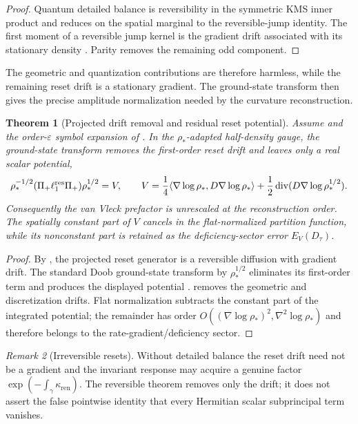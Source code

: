\documentclass[11pt]{article}
\newtheorem{theorem}{Theorem}[section]
\theoremstyle{definition}
\theoremstyle{remark}
\newtheorem{remark}[theorem]{Remark}
\newcommand{\eps}{\varepsilon}
\newcommand{\ren}{\mathrm{ren}}
\newcommand{\rstar}{\rho_*}
\DeclareMathOperator{\dive}{div}
\begin{document}
\begin{proof}
Quantum detailed balance is reversibility in the symmetric KMS inner product and
reduces on the spatial marginal to the reversible-jump identity.  The first
moment of a reversible jump kernel is the gradient drift associated with its
stationary density \cite{KossakowskiFGV,Alicki1976,Cipriani,KipnisLandim}.
Parity removes the remaining odd component.
\end{proof}

The geometric and quantization contributions are therefore harmless, while
the remaining reset drift is a stationary gradient. The ground-state transform
then gives the precise amplitude normalization needed by the curvature
reconstruction.

\begin{theorem}[Projected drift removal and residual reset potential]
\label{thm:drift-cancellation}
Assume  and the order-$\eps$ symbol expansion of
.  In the $\rstar$-adapted half-density gauge,
the ground-state transform removes the first-order reset drift and leaves only a
real scalar potential,
\[
 \rstar^{-1/2}(\Pi_+\ell_1^{\rm res}\Pi_+)\rstar^{1/2}=V,
 \qquad
 V=\frac14\langle\nabla\log\rstar,D\nabla\log\rstar\rangle
 +\frac12\dive(D\nabla\log\rstar^{1/2}).
\]
Consequently the van Vleck prefactor is unrescaled at the reconstruction order.
The spatially constant part of $V$ cancels in the flat-normalized partition
function, while its nonconstant part is retained as the deficiency-sector error
$E_V(D_\tau)$.
\end{theorem}

\begin{proof}
By , the projected reset generator is a reversible
diffusion with gradient drift.  The standard Doob ground-state transform by
$\rstar^{1/2}$ eliminates its first-order term and produces the displayed
potential \cite{Doob,Pinsky}.   removes the
geometric and discretization drifts.  Flat normalization subtracts the constant
part of the integrated potential; the remainder has order
$O((\nabla\log\rstar)^2,\nabla^2\log\rstar)$ and therefore belongs to the
rate-gradient/deficiency sector.
\end{proof}

\begin{remark}[Irreversible resets]
Without detailed balance the reset drift need not be a gradient and the invariant
response may acquire a genuine factor $\exp(-\int_\gamma\kappa_{\ren})$.
The reversible theorem removes only the drift; it does not assert the false
pointwise identity that every Hermitian scalar subprincipal term vanishes.
\end{remark}
\end{document}
